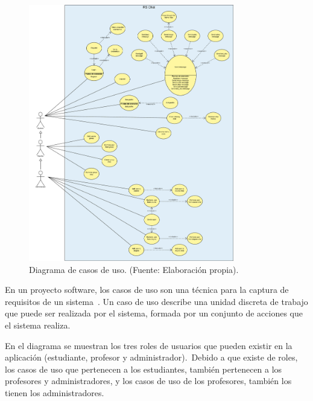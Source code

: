 
\begin{figure}[H]
	\centering
	\includegraphics[width=0.8\textwidth]{res/images/RSChat-Diagrams-Usecases}
	\caption{Diagrama de casos de uso. (Fuente: Elaboración propia).}
	\label{fig:casosDeUso}
\end{figure}

En un proyecto software, los casos de uso son una técnica para la captura de requisitos de un sistema~\cite{use_cases}.
Un caso de uso describe una unidad discreta de trabajo que puede ser realizada por el sistema, formada por un conjunto
de acciones que el sistema realiza.

En el diagrama se muestran los tres roles de usuarios que pueden existir en la aplicación (estudiante, profesor y
administrador).\ Debido a que existe  de roles, los casos de uso que pertenecen a los estudiantes,
también pertenecen a los profesores y administradores, y los casos de uso de los profesores, también los
tienen los administradores.

